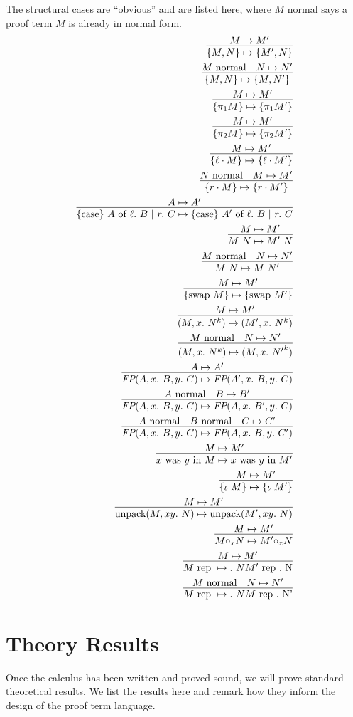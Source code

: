 \documentclass[12pt]{cmuthesis}
\theoremstyle{definition}
\theoremstyle{remark}
\newcommand{\stepsto}{\mapsto}
\begin{document}
\newcommand{\isnorm}[1]{#1\text{ normal}}
The structural cases are ``obvious'' and are listed here, where $\isnorm{M}$ says a proof term $M$ is already in normal form.
\begin{align*}
\infer{\eCons{M}{N} \stepsto \eCons{M'}{N}}{M \stepsto M'}\\
\infer{\eCons{M}{N} \stepsto \eCons{M}{N'}}{\isnorm{M} & N \stepsto N'}\\
\infer{\eProjL{M} \stepsto \eProjL{M'}}{M \stepsto M'}\\
\infer{\eProjR{M} \stepsto \eProjR{M'}}{M \stepsto M'}\\
\infer{\eInjL{M} \stepsto \eInjL{M'}}{M \stepsto M'}\\
\infer{\eInjR{M} \stepsto \eInjR{M'}}{\isnorm{N} & M \stepsto M'}\\
\infer{\eCase{A}{B}{C} \stepsto \eCase{A'}{B}{C}}{A \stepsto A'}\\
\infer{\eapp{M}{N} \stepsto \eapp{M'}{N}}{M \stepsto M'}\\
\infer{\eapp{M}{N} \stepsto \eapp{M}{N'}}{\isnorm{M} & N \stepsto N'}\\
\infer{\eSwap{M} \stepsto \eSwap{M'}}{M \stepsto M'}\\
\infer{\eloopelim{M}{N}{k} \stepsto \eloopelim{M'}{N}{k}}{M \stepsto M'}\\
\infer{\eloopelim{M}{N}{k} \stepsto \eloopelim{M}{N'}{k}}{\isnorm{M} & N \stepsto N'}\\
\infer{\efp{A}{B}{C} \stepsto \efp{A'}{B}{C}}{A \stepsto A'}\\
\infer{\efp{A}{B}{C} \stepsto \efp{A}{B'}{C}}{\isnorm{A} & B \stepsto B'}\\
\infer{\efp{A}{B}{C} \stepsto \efp{A}{B}{C'}}{\isnorm{A} & \isnorm{B} & C \stepsto C'}\\
\infer{\easgneq{x}{y}{M} \stepsto \easgneq{x}{y}{M'}}{M \stepsto M'}\\
\infer{\eSeq{M} \stepsto \eSeq{M'}}{M \stepsto M'}\\
\infer{\eunpack{M}{N} \stepsto \eunpack{M'}{N}}{M \stepsto M'}\\
\infer{\emon{M}{N}{x} \stepsto \emon{M'}{N}{x}}{M \stepsto M'}\\
\infer{\erep{M}{N} \stepsto \erep{M'}{N}}{M \stepsto M'}\\
\infer{\erep{M}{N} \stepsto \erep{M}{N'}}{M \isnorm & N \stepsto N'}\\
\end{align*}

\section{Theory Results}
Once the calculus has been written and proved sound, we will prove standard theoretical results.
We list the results here and remark how they inform the design of the proof term language.
\end{document}
